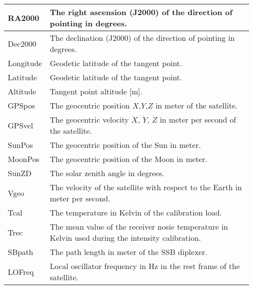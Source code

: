 \begin{longtable}{| p{} | p{} |}
     RA2000          & The right ascension (J2000) of the direction of pointing in degrees. \\ \hline
     Dec2000         & The declination (J2000) of the direction of pointing in degrees. \\ \hline
     Longitude       & Geodetic latitude of the tangent point.\\ \hline
     Latitude        & Geodetic latitude of the tangent point.\\ \hline
     Altitude        & Tangent point altitude [m].\\ \hline
     GPSpos          & The geocentric position $X$,$Y$,$Z$ in meter of the satellite.\\ \hline
     GPSvel          & The geocentric velocity $\dot X$, $\dot Y$, $\dot Z$ in meter per 
                         second of the satellite.\\ \hline
     SunPos          & The geocentric position of the Sun in meter.\\ \hline
     MoonPos         & The geocentric position of the Moon in meter.\\ \hline
     SunZD           & The solar zenith angle in degrees. \\ \hline
     Vgeo            & The velocity of the satellite with respect to the Earth in meter per second.\\ \hline
     Tcal            & The temperature in Kelvin of the calibration load.\\ \hline
     Trec            & The mean value of the receiver nosie temperature in Kelvin used during the intensity calibration.\\ \hline
     SBpath          & The path length in meter of the SSB diplexer. \\ \hline
     LOFreq          & Local oscillator frequency in Hz in the rest frame of the satellite.\\ \hline

\end{longtable}

